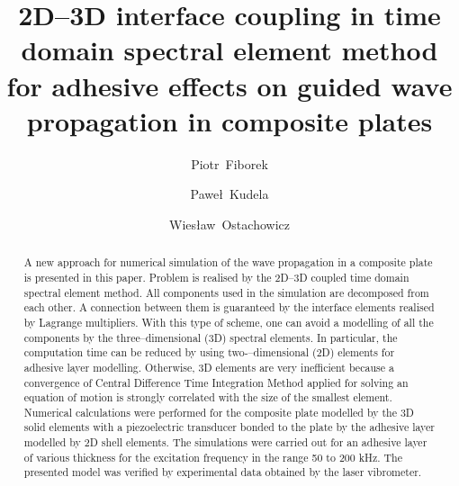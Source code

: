 \documentclass[preprint,12pt]{elsarticle}
\begin{document}
\begin{frontmatter}

\title{2D--3D interface coupling in time domain spectral element method for adhesive effects on guided wave propagation in composite plates}


\author{Piotr~Fiborek}
\author{Pawe\l~Kudela}
\author{Wies\l{}aw~Ostachowicz}

\address{Institute of Fluid Flow Machinery, Polish Academy of Sciences, Poland}

\begin{abstract}
A new approach for numerical simulation of the wave propagation in a composite plate is presented in this paper. Problem is realised by the 2D--3D coupled time domain spectral element method. All components used in the simulation are decomposed from each other. A connection between them is guaranteed by the interface elements realised by Lagrange multipliers. With this type of scheme, one can avoid a modelling of all the components by the three--dimensional (3D) spectral elements. In particular, the computation time can be reduced by using two-–dimensional (2D) elements for adhesive layer modelling. Otherwise, 3D elements are very inefficient because a convergence of Central Difference Time Integration Method applied for solving an equation of motion is strongly correlated with the size of the smallest element. Numerical calculations were performed for the composite plate modelled by the 3D solid elements with a piezoelectric transducer bonded to the plate by the adhesive layer modelled by 2D shell elements. The simulations were carried out for an adhesive layer of various thickness for the excitation frequency in the range 50 to 200 kHz. The presented model was verified by experimental data obtained by the laser vibrometer.
\end{abstract}


\end{frontmatter}
\end{document}
